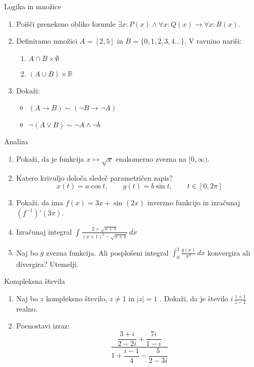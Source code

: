 \begin{frame}{Logika in množice}
	\begin{enumerate}
		\item
		Poišči preneksno obliko formule $\exists x: P(x) \land \forall x: Q(x) \rightarrow \forall x: R(x).$
		\item 
		Definiramo množici $A = [2,5]$ in $B = \{0, 1, 2, 3, 4\dots\}$.
		V ravnino nariši:
		\begin{enumerate}
		   \item $A \cap B \times \emptyset$
		   \item $(A \cup B) \times \mathbb{R}$
		\end{enumerate}
		\item
		Dokaži:
		\begin{itemize}
			\item $(A \rightarrow B) \sim (\lnot B \rightarrow \lnot A)$
			\item $\lnot(A \lor B) \sim \lnot A \land \lnot b $
		\end{itemize}
	\end{enumerate}
\end{frame}

\begin{frame}{Analiza}
	\begin{enumerate}
		\item
		Pokaži, da je funkcija $x \mapsto \sqrt{x}$ enakomerno zvezna na $[0, \infty)$.
		\item 
		Katero krivuljo določa sledeč parametričen zapis?
		$$
		   x(t) = a \cos t, \qquad %
		   y(t) = b \sin t, \qquad %
		   t \in [0, 2 \pi]
		$$ 
		\item
		Pokaži, da ima $f(x) = 3x + \sin(2x)$ inverzno funkcijo in izračunaj $(f^{-1})'(3\pi)$.
		
		\item
		Izračunaj integral 
		$\displaystyle {\int \frac{2+\sqrt{x+1}}{(x+1)^2-\sqrt{x+1}}} \, dx$
		\item 
		Naj bo $g$ zvezna funkcija. Ali posplošeni integral 
		$\int_{0}^{1} \frac{g(x)}{x^{2}} \, dx$
		konvergira ali divergira? Utemelji.
	\end{enumerate}
\end{frame}

\begin{frame}{Kompleksna števila}
	\begin{enumerate}
		\item
		Naj bo $z$ kompleksno število, $z \ne 1$ in $|z| = 1$ .
		Dokaži, da je število \( i \, \frac{z+1}{z-1} \) realno.
		\item
		Poenostavi izraz:
		$$
		 {\frac{\dfrac{3+i}{2-2i}+ \dfrac{7i}{1-i}}{1 + \dfrac{i-1}{4} - \dfrac{5}{2-3i}}}
		$$
	\end{enumerate}
\end{frame}